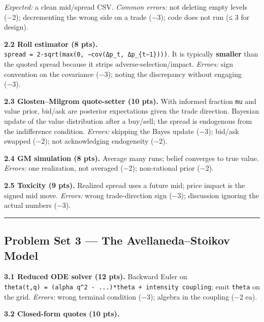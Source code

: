 \documentclass[
]{article}
\begin{document}
\emph{Expected:} a clean mid/spread CSV. \emph{Common errors:} not
deleting empty levels (−2); decrementing the wrong side on a trade (−3);
code does not run (≤ 3 for design).

\textbf{2.2 Roll estimator (8 pts).}
\texttt{spread\ =\ 2·sqrt(max(0,\ −cov(Δp\_t,\ Δp\_\{t−1\})))}. It is
typically \textbf{smaller} than the quoted spread because it strips
adverse-selection/impact. \emph{Errors:} sign convention on the
covariance (−3); noting the discrepancy without engaging (−3).

\textbf{2.3 Glosten--Milgrom quote-setter (10 pts).} With informed
fraction \texttt{mu} and value prior, bid/ask are posterior expectations
given the trade direction. Bayesian update of the value distribution
after a buy/sell; the spread is endogenous from the indifference
condition. \emph{Errors:} skipping the Bayes update (−3); bid/ask
swapped (−2); not acknowledging endogeneity (−2).

\textbf{2.4 GM simulation (8 pts).} Average many runs; belief converges
to true value. \emph{Errors:} one realization, not averaged (−2);
non-rational prior (−2).

\textbf{2.5 Toxicity (9 pts).} Realized spread uses a future mid; price
impact is the signed mid move. \emph{Errors:} wrong trade-direction sign
(−3); discussion ignoring the actual numbers (−3).

\begin{center}\rule{0.5\linewidth}{0.5pt}\end{center}

\subsection{Problem Set 3 --- The Avellaneda--Stoikov
Model}\label{problem-set-3-the-avellanedastoikov-model}

\textbf{3.1 Reduced ODE solver (12 pts).} Backward Euler on
\texttt{theta\textquotesingle{}(t,q)\ =\ (alpha\ q\^{}2\ -\ ...)*theta\ +\ intensity\ coupling};
emit \texttt{theta} on the grid. \emph{Errors:} wrong terminal condition
(−3); algebra in the coupling (−2 ea).

\textbf{3.2 Closed-form quotes (10 pts).}
\end{document}

